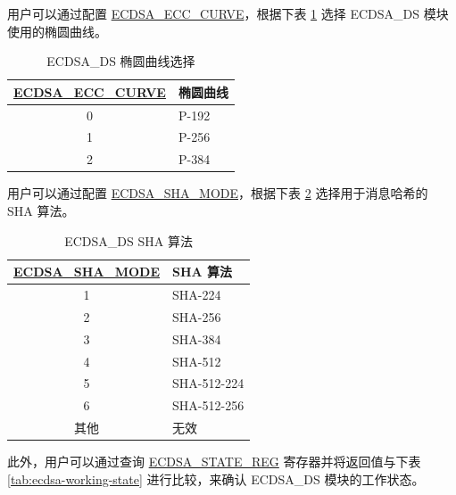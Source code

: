 \documentclass[main\_\_CN.tex]{subfiles}
\begin{document}
用户可以通过配置 \hyperref[fielddesc:ECDSAECCCURVE]{ECDSA\_ECC\_CURVE}，根据下表 \ref{tab:ecdsa-curve-selection} 选择 ECDSA\_DS 模块使用的椭圆曲线。

\begin{table}[H]
    \centering
    \caption{ECDSA\_DS 椭圆曲线选择}
    \label{tab:ecdsa-curve-selection}
    \begin{tabular}{ | c | l | }
    \hline
        \rowcolor{lightgray}
        \textbf{\hyperref[fielddesc:ECDSAECCCURVE]{ECDSA\_ECC\_CURVE}}      & \textbf{椭圆曲线}\\
        \hline
        0                       & P-192    \\\hline
        1                       & P-256    \\\hline
        2                       & P-384    \\\hline
    \end{tabular}
\end{table}

用户可以通过配置 \hyperref[fielddesc:ECDSASHAMODE]{ECDSA\_SHA\_MODE}，根据下表 \ref{tab:ecdsa-sha-algorithms} 选择用于消息哈希的 SHA 算法。

\begin{table}[H]
    \centering
    \caption{ECDSA\_DS SHA 算法}
    \label{tab:ecdsa-sha-algorithms}
    \begin{tabular}{ | c | l | }
    \hline
        \rowcolor{lightgray}
        \textbf{\hyperref[fielddesc:ECDSASHAMODE]{ECDSA\_SHA\_MODE}}      & \textbf{SHA 算法}\\
        \hline
        1                       & SHA-224    \\\hline
        2                       & SHA-256    \\\hline
        3                       & SHA-384    \\\hline
        4                       & SHA-512    \\\hline
        5                       & SHA-512-224    \\\hline
        6                       & SHA-512-256    \\\hline
        其他                  & 无效    \\\hline
    \end{tabular}
\end{table}

此外，用户可以通过查询 \hyperref[regdesc:ECDSASTATEREG]{ECDSA\_STATE\_REG} 寄存器并将返回值与下表 \ref{tab:ecdsa-working-state} 进行比较，来确认 ECDSA\_DS 模块的工作状态。
\end{document}
